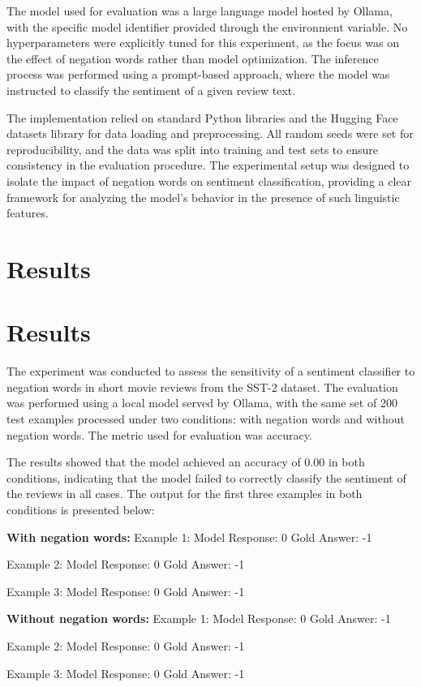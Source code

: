 \documentclass{article}
\begin{document}
The model used for evaluation was a large language model hosted by Ollama, with the specific model identifier provided through the environment variable. No hyperparameters were explicitly tuned for this experiment, as the focus was on the effect of negation words rather than model optimization. The inference process was performed using a prompt-based approach, where the model was instructed to classify the sentiment of a given review text. 

The implementation relied on standard Python libraries and the Hugging Face datasets library for data loading and preprocessing. All random seeds were set for reproducibility, and the data was split into training and test sets to ensure consistency in the evaluation procedure. The experimental setup was designed to isolate the impact of negation words on sentiment classification, providing a clear framework for analyzing the model's behavior in the presence of such linguistic features.
\section{Results}
\section{Results}

The experiment was conducted to assess the sensitivity of a sentiment classifier to negation words in short movie reviews from the SST-2 dataset. The evaluation was performed using a local model served by Ollama, with the same set of 200 test examples processed under two conditions: with negation words and without negation words. The metric used for evaluation was accuracy.

The results showed that the model achieved an accuracy of 0.00 in both conditions, indicating that the model failed to correctly classify the sentiment of the reviews in all cases. The output for the first three examples in both conditions is presented below:

\textbf{With negation words:}
Example 1:
Model Response: 0
Gold Answer: -1

Example 2:
Model Response: 0
Gold Answer: -1

Example 3:
Model Response: 0
Gold Answer: -1

\textbf{Without negation words:}
Example 1:
Model Response: 0
Gold Answer: -1

Example 2:
Model Response: 0
Gold Answer: -1

Example 3:
Model Response: 0
Gold Answer: -1
\end{document}
